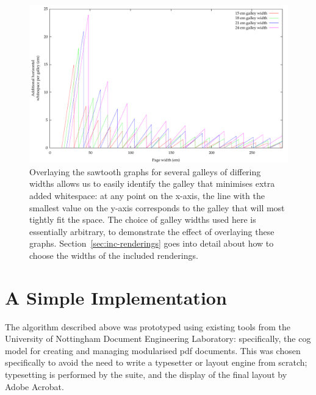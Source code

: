 \begin{figure}
 \includegraphics[height=0.5\textheight]{gnuplot/overlay}
 \caption[Extra whitespace in a multi-galley document]{Overlaying the sawtooth graphs for several galleys of differing widths allows us to easily identify the galley that minimises extra added whitespace: at any point on the x-axis, the line with the smallest value on the y-axis corresponds to the galley that will most tightly fit the space. The choice of galley widths used here is essentially arbitrary, to demonstrate the effect of overlaying these graphs. Section~\ref{sec:inc-renderings} goes into detail about how to choose the widths of the included renderings.}
 \label{fig:overlay}
\end{figure}

\section{A Simple Implementation}
The algorithm described above was prototyped using existing tools from the University of Nottingham Document Engineering Laboratory: specifically, the \gls{cog} model \hspace{0pt}\cite{Bagley2003} for creating and managing modularised \gls{pdf} documents. This was chosen specifically to avoid the need to write a typesetter or layout engine from scratch; typesetting is performed by the \troff{} suite, and the display of the final layout by Adobe Acrobat.  %

